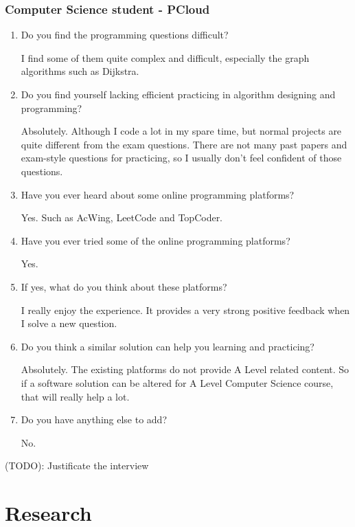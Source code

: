 \documentclass[a4paper]{report}
\begin{document}
\subsubsection{Computer Science student - PCloud}

\begin{enumerate}
    \item Do you find the programming questions difficult?

    I find some of them quite complex and difficult, especially the graph algorithms such as Dijkstra.

    \item Do you find yourself lacking efficient practicing in algorithm designing and programming?

    Absolutely. Although I code a lot in my spare time, but normal projects are quite different from the exam questions. There are not many past papers and exam-style questions for practicing, so I usually don't feel confident of those questions.

    \item Have you ever heard about some online programming platforms?
    
    Yes. Such as AcWing, LeetCode and TopCoder.

    \item Have you ever tried some of the online programming platforms?

    Yes.

    \item If yes, what do you think about these platforms?
    
    I really enjoy the experience. It provides a very strong positive feedback when I solve a new question.

    \item Do you think a similar solution can help you learning and practicing?

    Absolutely. The existing platforms do not provide A Level related content. So if a software solution can be altered for A Level Computer Science course, that will really help a lot.

    \item Do you have anything else to add?

    No.

\end{enumerate}

(TODO): Justificate the interview

\section{Research}
\end{document}
